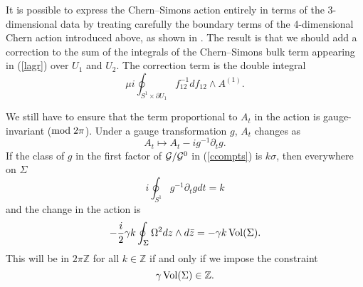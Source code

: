 \documentclass[a4paper,11pt]{article}
\begin{document}
It is possible to express the Chern--Simons action entirely in terms
of the 3-dimensional data by treating carefully the boundary terms
of the 4-dimensional Chern action introduced above, as shown in \cite{DGS}. 
The result is that we should add a correction to the sum of the 
integrals of the Chern--Simons bulk term appearing in (\ref{lagr})
over $U_{1}$ and $U_{2}$. The correction term is the double integral
\begin{equation} \label{correct}
\mu i \oint_{S^{1}\times \partial U_{1}}f_{12}^{-1}df_{12}\wedge A^{(1)}.
\end{equation}


We still have to ensure that the term proportional to $A_{t}$ in the
action is gauge-invariant (${\rm mod}\; 2\pi$). Under a gauge
transformation $g$, $A_{t}$ changes as
\[
A_{t} \mapsto
A_{t} -i g^{-1}\partial_{t}g.
\]
If the class of $g$ in the first factor of ${\cal G}/{\cal G}^{0}$
in (\ref{ccompts}) is $k\sigma$, then everywhere on $\Sigma$
\[
i\oint_{S^{1}} g^{-1} \partial_{t}g dt=k 
\]
and the change in the action is
\[
-\frac{i}{2}
\gamma k \oint_{\Sigma}\Omega^{2}dz\wedge d\bar{z}=-\gamma k\, 
{\rm Vol}(\Sigma).
\]
This will be in $2\pi\mathbb{Z}$
for all $k\in \mathbb{Z}$ if and only if we impose the constraint
\begin{equation}\label{gamma}
\gamma \,{\rm Vol}(\Sigma) \in \mathbb{Z}.
\end{equation}
\end{document}
